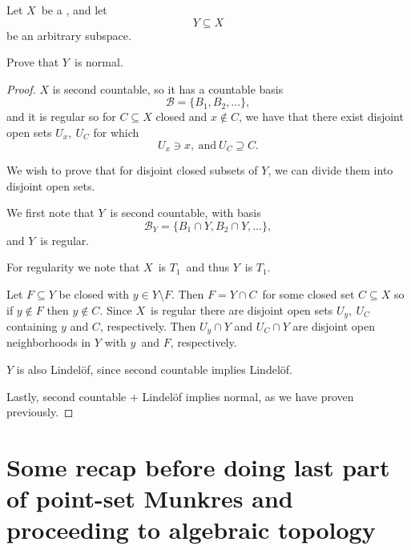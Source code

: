 \documentclass[11pt]{article}
\begin{document}
\begin{prob}
    Let $X$ be a , and let 
    \[
        Y \subseteq X 
    \]
    be an arbitrary subspace. 

    Prove that $Y$ is normal. 
\end{prob}
\begin{proof}
    $X$ is second countable, so it has a 
    countable basis 
    \[
        \mathcal B = \{B_1,B_2,\ldots\}, 
    \]
    and it is regular so for 
    $C \subseteq X$ closed and $x\not\in C$, we have that 
    there exist disjoint open sets $U_x, \ U_C$ for which  
    \[
        U_x \ni x, \ \text{and} \ U_C \supseteq C. 
    \]

    We wish to prove that for disjoint closed subsets of 
    $Y$, we can divide them into disjoint open sets.  

    We first note that 
    $Y$ is second countable, with basis 
    \[
        \mathcal B_Y = \{B_1 \cap Y, B_2 \cap Y, \ldots\},  
    \]
    and $Y$ is regular. 

    For regularity we note that $X$ is $T_1$ and 
    thus $Y$ is $T_1$. 

    Let $F \subseteq Y$ be closed with $y \in Y \setminus F$. 
    Then $F = Y \cap C$ for some closed set $C \subseteq X$ so 
    if $y \not\in F$ then $y\not\in C$. Since $X$ is regular there 
    are disjoint open sets $U_y, \ U_C$ containing 
    $y$ and $C$, respectively. Then 
    $U_y \cap Y$ and $U_C \cap Y$ are disjoint open neighborhoods 
    in $Y$ with $y$ and $F$, respectively. 
    
    $Y$ is also Lindel{\"o}f, since 
    second countable implies Lindel{\"o}f. 

    Lastly, second countable $+$ Lindel{\"o}f implies 
    normal, as we have proven previously. 
\end{proof}

\section{Some recap before doing last 
part of point-set Munkres and proceeding to 
algebraic topology}
\end{document}
